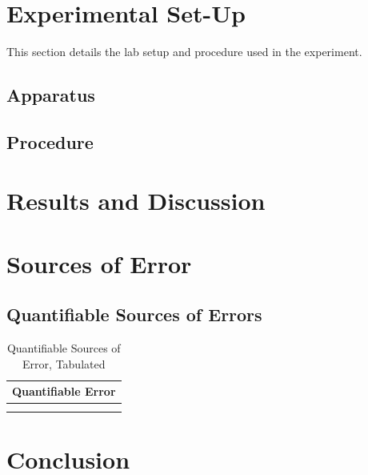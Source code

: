 \documentclass[runningheads]{llncs}
\begin{document}
\section{Experimental Set-Up}

\noindent
This section details the lab setup and procedure used in the experiment.

\subsection{Apparatus}

\subsection{Procedure}\label{sec:procedure}




\section{Results and Discussion}




\section{Sources of Error}\label{sec:source_of_error}

\subsection{Quantifiable Sources of Errors}
\begin{table}[H]
\begin{center}
    \begin{tabular}{ll}
        \toprule
        \multicolumn{2}{c}{Quantifiable Error}\\
        \midrule
         & \\
         & \\
        \bottomrule
\end{tabular}
\end{center}
\caption{Quantifiable Sources of Error, Tabulated}
\label{tab:quant_error}
\end{table}




\section{Conclusion}
\end{document}
